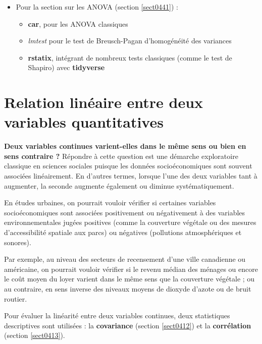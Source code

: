\documentclass[
  11pt,
  french,
]{book}
\makeatletter
\providecommand{\tightlist}{%
  \setlength{\itemsep}{0pt}\setlength{\parskip}{0pt}}
\newenvironment{kframev}{%
\medskip{}
\setlength{\fboxsep}{.8em}
 \def\at@end@of@kframev{}%
 \ifinner\ifhmode%
  \def\at@end@of@kframev{\end{minipage}}%
  \begin{minipage}{\columnwidth}%
 \fi\fi%
 \def\FrameCommand##1{\hskip\@totalleftmargin \hskip-\fboxsep
 \colorbox{shadebluecolor}{##1}\hskip-\fboxsep
     \hskip-\linewidth \hskip-\@totalleftmargin \hskip\columnwidth}%
 \MakeFramed {\advance\hsize-\width
   \@totalleftmargin\z@ \linewidth\hsize
   \@setminipage}}%
 {\par\unskip\endMakeFramed%
 \at@end@of@kframev}
\newenvironment{rmdblock}[1]
  {
  \begin{itemize}
  \renewcommand{\labelitemi}{
    \raisebox{-.7\height}[0pt][0pt]{
      {\setkeys{Gin}{width=3em,keepaspectratio}\texttt{[image: images/\#1]}}
    }
  }
  \setlength{\fboxsep}{1em}
  \begin{kframev}
  \small
  \item
  }
  {
  \end{kframev}
  \end{itemize}
  }
\newenvironment{bloc_package}
  {\begin{rmdblock}{package}}
  {\end{rmdblock}}
\newenvironment{bloc_objectif}
  {\begin{rmdblock}{objectif}}
  {\end{rmdblock}}
\makeatother
\begin{document}
\begin{bloc_package}
\begin{itemize}
  \begin{itemize}
  \tightlist
  \item
    \textbf{sjstats} pour réaliser des test \emph{t} pondérés
  \item
    \textbf{effectsize}, pour calculer les tailles d'effet de tests de \emph{t}
  \end{itemize}
\item
  Pour la section sur les ANOVA (section \ref{sect0441}) :

  \begin{itemize}
  \tightlist
  \item
    \textbf{car}, pour les ANOVA classiques
  \item
    \emph{lmtest} pour le test de Breusch-Pagan d'homogénéité des variances
  \item
    \textbf{rstatix}, intégrant de nombreux tests classiques (comme le test de Shapiro) avec \textbf{tidyverse}
  \end{itemize}
\end{itemize}

\end{bloc_package}

\hypertarget{sect041}{%
\section{Relation linéaire entre deux variables quantitatives}\label{sect041}}

\begin{bloc_objectif}

\textbf{Deux variables continues varient-elles dans le même sens ou bien en sens contraire ?} Répondre à cette question est une démarche exploratoire classique en sciences sociales puisque les données socioéconomiques sont souvent associées linéairement. En d'autres termes, lorsque l'une des deux variables tant à augmenter, la seconde augmente également ou diminue systématiquement.

En études urbaines, on pourrait vouloir vérifier si certaines variables socioéconomiques sont associées positivement ou négativement à des variables environnementales jugées positives (comme la couverture végétale ou des mesures d'accessibilité spatiale aux parcs) ou négatives (pollutions atmosphériques et sonores).

Par exemple, au niveau des secteurs de recensement d'une ville canadienne ou américaine, on pourrait vouloir vérifier si le revenu médian des ménages ou encore le coût moyen du loyer varient dans le même sens que la couverture végétale ; ou au contraire, en sens inverse des niveaux moyens de dioxyde d'azote ou de bruit routier.

Pour évaluer la linéarité entre deux variables continues, deux statistiques descriptives sont utilisées : la \textbf{covariance} (section \ref{sect0412}) et la \textbf{corrélation} (section \ref{sect0413}).

\end{bloc_objectif}
\end{document}
